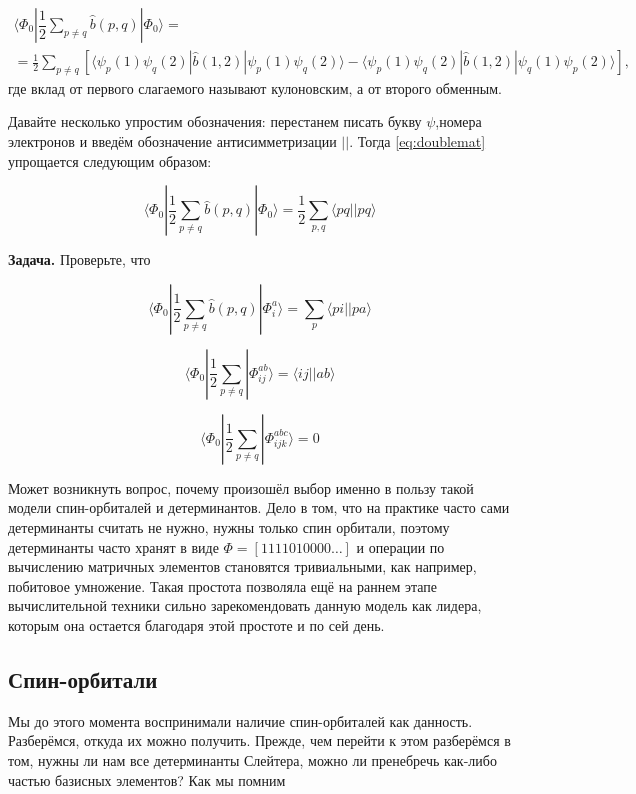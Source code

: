 \documentclass[12pt, oneside]{article}
\numberwithin{equation}{section}  %
\begin{document}
\begin{multline}
\langle \Phi_0 | \dfrac{1}{2} \sum_{p \neq q} \hat{b}(p, q) | \Phi_0 \rangle =\\=
\frac{1}{2} \sum_{p\neq q} 
\left[\langle \psi_p(1) \psi_q (2) |\hat{b} (1, 2)| \psi_p (1) \psi_q (2) \rangle  - \langle \psi_p(1) \psi_q (2) | \hat{b} (1, 2) | \psi_q (1) \psi_p (2) \rangle \right],
\label{eq:doublemat}
\end{multline}
где вклад от первого слагаемого называют кулоновским, а от второго обменным. 

Давайте несколько упростим обозначения: перестанем писать букву \(\psi\),номера электронов и введём обозначение антисимметризации \(||\). Тогда \eqref{eq:doublemat} упрощается следующим образом:

\begin{equation}
\langle \Phi_0 | \dfrac{1}{2} \sum_{p \neq q} \hat{b}(p, q) | \Phi_0 \rangle =
\dfrac{1}{2}\sum_{p, q} \langle p q || p q \rangle
\end{equation}

\textbf{Задача.} Проверьте, что 

\[\langle \Phi_0 | \dfrac{1}{2} \sum_{p \neq q} \hat{b}(p, q) | \Phi_i^a \rangle = \sum_{p} \langle p i || p a \rangle\]

\[\langle \Phi_0 | \dfrac{1}{2} \sum_{p \neq q} | \Phi_{ij} ^{a b} \rangle = \langle i j  || a b \rangle\]

\[\langle \Phi_0 | \dfrac{1}{2} \sum_{p \neq q} | \Phi_{ijk} ^{a b c} \rangle = 0\]

Может возникнуть вопрос, почему произошёл выбор именно в пользу такой модели спин-орбиталей и детерминантов. Дело в том, что на практике часто сами детерминанты считать не нужно, нужны только спин орбитали, поэтому детерминанты часто хранят в виде \(\Phi = [1 1 1 1 0 1 0 0 0 0 \dots]\) и операции по вычислению матричных элементов становятся тривиальными, как например, побитовое умножение. Такая простота позволяла ещё на раннем этапе вычислительной техники сильно зарекомендовать данную модель как лидера, которым она остается благодаря этой простоте и по сей день.

\subsection{Спин-орбитали}

Мы до этого момента воспринимали наличие спин-орбиталей как данность. Разберёмся, откуда их можно получить. Прежде, чем перейти к этом разберёмся в том, нужны ли нам все детерминанты Слейтера, можно ли пренебречь как-либо частью базисных элементов? Как мы помним
\end{document}
